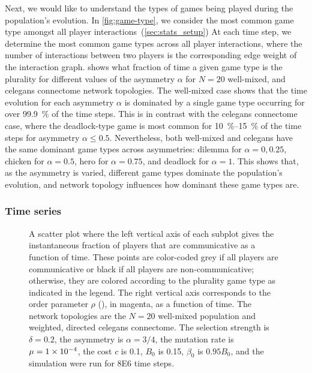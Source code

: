 \documentclass[pdflatex,lineno,referee,sn-mathphys-ay]{sn-jnl}
\begin{document}
Next, we would like to understand the types of games being played
during the population's evolution.
In \cref{fig:game-type}, we consider the most common game type
amongst all player interactions~(\cf \cref{sec:stats_setup})
At each time step, we determine the most common game types
across all player interactions,
where the number of interactions between two players
is the corresponding edge weight of the interaction graph.
 shows what fraction of time
a given game type is the plurality for different values
of the asymmetry $\alpha$ for
$N=20$ well-mixed,
and
\gls{celegans} connectome
network topologies.
The  well-mixed case
shows that the time evolution for each asymmetry $\alpha$
is dominated by a single game type
occurring for over \SI{99.9}{\percent} of the time steps.
This is in contrast with the
 \gls{celegans} connectome case,
where the deadlock-type game is most common
for \SIrange{10}{15}{\percent} of the time steps
for asymmetry $\alpha \le 0.5$.
Nevertheless, both  well-mixed
and  \gls{celegans}
have the same dominant game types
across asymmetries:
dilemma for $\alpha = 0, 0.25$, chicken for $\alpha = 0.5$,
hero for $\alpha = 0.75$, and deadlock for $\alpha = 1$.
This shows that, as the asymmetry is varied,
different game types dominate the population's evolution,
and network topology influences how dominant these game types are.

\subsubsection{Time series}
\begin{figure}
  \centering
  
  \caption{
    A scatter plot where
    the left vertical axis of each subplot gives
    the instantaneous fraction of players that are communicative
    as a function of time.
    These points are color-coded
    grey if all players are communicative or
    black if all players are non-communicative;
    otherwise, they are colored according
    to the plurality game type as indicated in the legend.
    The right vertical axis corresponds to the order parameter $\rho$
    (), in magenta, as a function of time.
    The network topologies are the
    $N=20$ well-mixed population
    and
    weighted, directed \gls{celegans} connectome.
    The selection strength is $\delta=0.2$,
    the asymmetry is $\alpha=3/4$,
    the mutation rate is $\mu=\num{1E-4}$,
    the cost $c$ is \num{0.1},
    $B_0$ is \num{0.15},
    $\beta_0$ is $\num{0.95} B_0$,
    and the simulation were run for \num{8E6} time steps.
  }
  \label{fig:time-series}
\end{figure}
\end{document}

